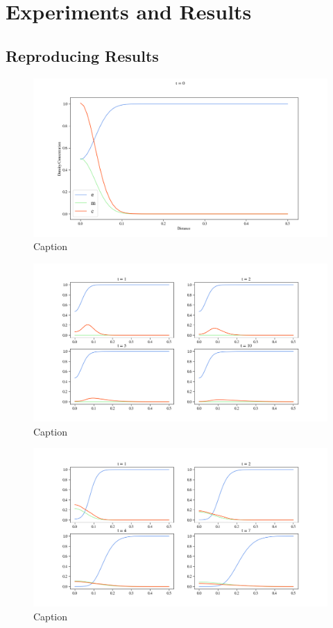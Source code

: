 \section{Experiments and Results}
\subsection{Reproducing Results}
\begin{figure}
    \centering
    \includegraphics[width=\textwidth]{resources/images/inital_value_plot_figure.png}
    \caption{Caption}
    \label{fig:gliederung}
\end{figure}
\begin{figure}
    \centering
    \includegraphics[width=\textwidth]{resources/images/0.001_0.001_0.001_10_0.1_0.5_0.005_0_0.png}
    \caption{Caption}
    \label{fig:gliederung}
\end{figure}
\begin{figure}
    \centering
    \includegraphics[width=\textwidth]{resources/images/0.001_0.001_0.001_10_0.1_0_0.001_0_0.png}
    \caption{Caption}
    \label{fig:gliederung}
\end{figure}
